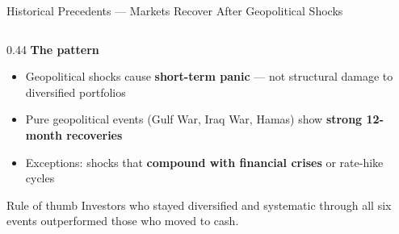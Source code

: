 \documentclass[aspectratio=169,10pt]{beamer}
\newcommand{\er}{{\textcolor{navy}{\rule{16pt}{2.5pt}}}\enspace}
\begin{document}
\begin{frame}{Historical Precedents — Markets Recover After Geopolitical Shocks}
\begin{columns}[T,totalwidth=\textwidth]
\begin{column}{0.44\textwidth}
\vspace{4pt}
{\scriptsize\bfseries\color{navy}\er The pattern}\\[4pt]
{\footnotesize
\begin{itemize}\setlength\itemsep{2pt}
  \item Geopolitical shocks cause \textbf{short-term panic} — not structural damage to diversified portfolios
  \item Pure geopolitical events (Gulf War, Iraq War, Hamas) show \textbf{strong 12-month recoveries}
  \item Exceptions: shocks that \textbf{compound with financial crises} or rate-hike cycles
\end{itemize}
}
\vspace{3pt}
\begin{block}{\small Rule of thumb}
{\footnotesize Investors who stayed diversified and systematic through all six events outperformed those who moved to cash.}
\end{block}
\end{column}

\end{columns}
\end{frame}
\end{document}
